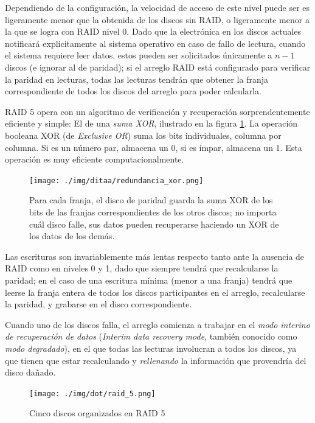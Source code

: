 \documentclass[11pt,fleqn]{book} %
\begin{document}
Dependiendo de la configuración, la velocidad de acceso de este nivel
puede ser es ligeramente menor que la obtenida de los discos
sin RAID, o ligeramente menor a la que se logra con RAID
nivel 0. Dado que la electrónica en los discos actuales
notificará explícitamente al sistema operativo en caso de fallo de
lectura, cuando el sistema requiere leer datos, estos pueden ser
solicitados únicamente a $n-1$ discos (e ignorar al de paridad); si el arreglo RAID está
configurado para verificar la paridad en lecturas, todas
las lecturas tendrán que obtener la franja correspondiente de todos
los discos del arreglo para poder calcularla.

RAID 5 opera con un algoritmo de verificación y recuperación
sorprendentemente eficiente y simple: El de una \emph{suma XOR}, ilustrado
en la figura \ref{FS_FIS_redundancia_xor}. La operación booleana XOR
(de \emph{Exclusive OR}) suma los bits individuales, columna por
columna. Si es un número par, almacena un 0, si es impar, almacena
un 1. Esta operación es muy eficiente computacionalmente.

\begin{figure}[htb]
\centering
\texttt{[image: ./img/ditaa/redundancia\_xor.png]}
\caption{\label{FS_FIS_redundancia_xor}Para cada franja, el disco de paridad guarda la suma XOR de los bits de las franjas correspondientes de los otros discos; no importa cuál disco falle, sus datos pueden recuperarse haciendo un XOR de los datos de los demás.}
\end{figure}

Las escrituras son invariablemente más lentas respecto tanto ante
la ausencia de RAID como en niveles 0 y 1, dado que siempre
tendrá que recalcularse la paridad; en el caso de una escritura
mínima (menor a una franja) tendrá que leerse la franja entera de
todos los discos participantes en el arreglo, recalcularse la
paridad, y grabarse en el disco correspondiente.

Cuando uno de los discos falla, el arreglo comienza a trabajar en el
\emph{modo interino de recuperación de datos} (\emph{Interim data recovery mode}, también conocido como \emph{modo degradado}), en el que todas las lecturas involucran a todos los discos, ya
que tienen que estar recalculando y \emph{rellenando} la información que
provendría del disco dañado.

\begin{figure}[htb]
\centering
\texttt{[image: ./img/dot/raid\_5.png]}
\caption{\label{FS_FIS_raid_5}Cinco discos organizados en RAID 5}
\end{figure}
\end{document}
